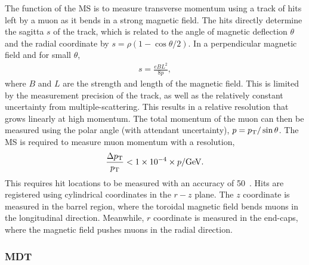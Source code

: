 The function of the MS is to measure transverse momentum using a track of hits left by a muon as it bends in a strong magnetic field.
The hits directly determine the sagitta $s$ of the track, which is related to the angle of magnetic deflection $\theta$ and the radial coordinate by $s=\rho(1-\cos\theta/2)$.
In a perpendicular magnetic field and for small $\theta$,
\begin{equation}\begin{split}
    s=\frac{eBL^2}{8p},
\end{split}\end{equation}
where $B$ and $L$ are the strength and length of the magnetic field.
This is limited by the measurement precision of the track, as well as the relatively constant uncertainty from multiple-scattering.
This results in a relative resolution that grows linearly at high momentum.
The total momentum of the muon can then be measured using the polar angle (with attendant uncertainty), $p=p_\text{T}/\sin{\theta}$.
\cite{grupen}
The MS is required to measure muon momentum with a resolution,
\begin{equation}\begin{split}
    \frac{\Delta p_\text{T}}{p_\text{T}}<1\times10^{-4}\times p/\text{GeV}.
\end{split}\end{equation}
This requires hit locations to be measured with an accuracy of 50~\um.
Hits are registered using cylindrical coordinates in the $r-z$ plane.
The $z$ coordinate is measured in the barrel region, where the toroidal magnetic field bends muons in the longitudinal direction.
Meanwhile, $r$ coordinate is measured in the end-caps, where the magnetic field pushes muons in the radial direction.
\cite{muonTdr}

\subsubsection{MDT} %

